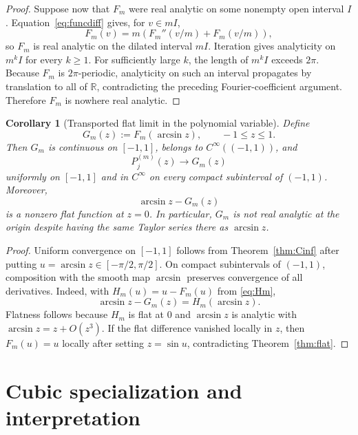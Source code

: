 \documentclass[11pt]{article}
\newtheorem{corollary}[theorem]{Corollary}
\theoremstyle{remark}
\begin{document}
\begin{proof}
Suppose now that $F_m$ were real analytic on some nonempty open interval $I$.
Equation~\eqref{eq:funcdiff} gives, for $v\in mI$,
\[
F_m(v)=m\left(F_m''(v/m)+F_m(v/m)\right),
\]
so $F_m$ is real analytic on the dilated interval $mI$.  Iteration gives
analyticity on $m^kI$ for every $k\ge1$.  For sufficiently large $k$, the
length of $m^kI$ exceeds $2\pi$.  Because $F_m$ is $2\pi$-periodic, analyticity
on such an interval propagates by translation to all of $\mathbb R$,
contradicting the preceding Fourier-coefficient argument.  Therefore $F_m$ is
nowhere real analytic.
\end{proof}

\begin{corollary}[Transported flat limit in the polynomial variable]
\label{cor:zlimit}
Define
\begin{equation}
G_m(z):=F_m(\arcsin z),\qquad -1\le z\le1.
\label{eq:Gm}
\end{equation}
Then $G_m$ is continuous on $[-1,1]$, belongs to $C^\infty((-1,1))$, and
\begin{equation}
P^{(m)}_j(z)\longrightarrow G_m(z)
\end{equation}
uniformly on $[-1,1]$ and in $C^\infty$ on every compact subinterval of
$(-1,1)$.  Moreover,
\begin{equation}
\arcsin z-G_m(z)
\end{equation}
is a nonzero flat function at $z=0$.  In particular, $G_m$ is not real
analytic at the origin despite having the same Taylor series there as
$\arcsin z$.
\end{corollary}

\begin{proof}
Uniform convergence on $[-1,1]$ follows from Theorem~\ref{thm:Cinf} after
putting $u=\arcsin z\in[-\pi/2,\pi/2]$.  On compact subintervals of
$(-1,1)$, composition with the smooth map $\arcsin$ preserves convergence of
all derivatives.  Indeed, with $H_m(u)=u-F_m(u)$ from \eqref{eq:Hm},
\[
\arcsin z-G_m(z)=H_m(\arcsin z).
\]
Flatness follows because $H_m$ is flat at $0$ and $\arcsin z$ is analytic
with $\arcsin z=z+O(z^3)$.  If the flat difference vanished locally in $z$, then
$F_m(u)=u$ locally after setting $z=\sin u$, contradicting
Theorem~\ref{thm:flat}.
\end{proof}

\section{Cubic specialization and interpretation}
\end{document}
